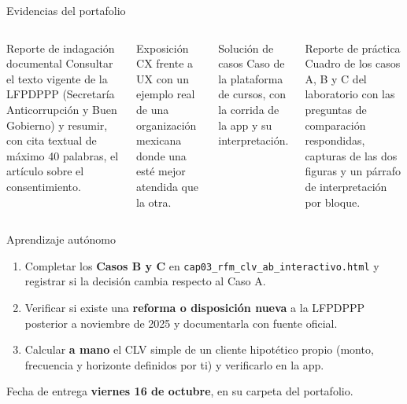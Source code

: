 \documentclass[aspectratio=169,xcolor=dvipsnames]{beamer}
\begin{document}
\begin{frame}{Evidencias del portafolio}
\small
\begin{columns}[T]
  \begin{block}{Reporte de indagación documental}
    \scriptsize Consultar el texto vigente de la LFPDPPP (Secretaría Anticorrupción y Buen Gobierno) y resumir, con cita textual de máximo 40 palabras, el artículo sobre el consentimiento.
  \end{block}
  \begin{block}{Exposición}
    \scriptsize CX frente a UX con un ejemplo real de una organización mexicana donde una esté mejor atendida que la otra.
  \end{block}
  \begin{block}{Solución de casos}
    \scriptsize Caso de la plataforma de cursos, con la corrida de la app y su interpretación.
  \end{block}
  \begin{block}{Reporte de práctica}
    \scriptsize Cuadro de los casos A, B y C del laboratorio con las preguntas de comparación respondidas, capturas de las dos figuras y un párrafo de interpretación por bloque.
  \end{block}
\end{columns}
\end{frame}

\begin{frame}{Aprendizaje autónomo}
\footnotesize
\begin{enumerate}
  \item Completar los \textbf{Casos B y C} en \texttt{cap03\_rfm\_clv\_ab\_\allowbreak interactivo.html} y registrar si la decisión cambia respecto al Caso A.
  \vspace{1pt}
  \item Verificar si existe una \textbf{reforma o disposición nueva} a la LFPDPPP posterior a noviembre de 2025 y documentarla con fuente oficial.
  \vspace{1pt}
  \item Calcular \textbf{a mano} el CLV simple de un cliente hipotético propio (monto, frecuencia y horizonte definidos por ti) y verificarlo en la app.
\end{enumerate}
\vspace{2pt}
\begin{alertblock}{Fecha de entrega}
  \textbf{viernes 16 de octubre}, en su carpeta del portafolio.
\end{alertblock}
\end{frame}
\end{document}
